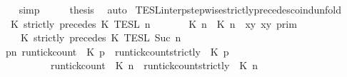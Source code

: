 \begin{isabellebody}
\ \ \ \ \isamarkupfalse%
\ simp\isanewline
\ \ \isamarkupfalse%
\ \isamarkupfalse%
\ {\isacharquery}thesis\ \isamarkupfalse%
\ auto\isanewline
{}\isamarkupfalse%
%
\endisatagproof
{\isafoldproof}%
%
\isadelimproof
\isanewline
%
\endisadelimproof
\isanewline
{}\isamarkupfalse%
\ TESL{\isacharunderscore}interp{\isacharunderscore}stepwise{\isacharunderscore}strictly{\isacharunderscore}precedes{\isacharunderscore}coind{\isacharunderscore}unfold{\isacharcolon}\isanewline
\ \ \ {\isacartoucheopen}{\isasymlbrakk}\ K\ strictly\ precedes\ K\ {\isasymrbrakk}\isactrlsub T\isactrlsub E\isactrlsub S\isactrlsub L\isactrlbsup {\isasymge}\ n\isactrlesup \ {\isacharequal}\isanewline
\ \ \ \ {\isasymlbrakk}\ {\isacharparenleft}{\isasymlceil}{\isacharhash}\isactrlsup {\isasymle}\ K\ n{\isacharcomma}\ {\isacharhash}\isactrlsup {\isacharless}\ K\ n{\isasymrceil}\ {\isasymin}\ {\isacharparenleft}{\isasymlambda}{\isacharparenleft}x{\isacharcomma}y{\isacharparenright}{\isachardot}\ x{\isasymle}y{\isacharparenright}{\isacharparenright}\ {\isasymrbrakk}\isactrlsub p\isactrlsub r\isactrlsub i\isactrlsub m\isanewline
\ \ \ \ {\isasyminter}\ {\isasymlbrakk}\ K\ strictly\ precedes\ K\ {\isasymrbrakk}\isactrlsub T\isactrlsub E\isactrlsub S\isactrlsub L\isactrlbsup {\isasymge}\ Suc\ n\isactrlesup {\isacartoucheclose}\isanewline
%
\isadelimproof
%
\endisadelimproof
%
\isatagproof
{}\isamarkupfalse%
\ {\isacharminus}\isanewline
\ \ \isamarkupfalse%
\ {\isacartoucheopen}{\isacharbraceleft}\ {\isasymrho}{\isachardot}\ {\isasymforall}p{\isasymge}n{\isachardot}\ {\isacharparenleft}run{\isacharunderscore}tick{\isacharunderscore}count\ {\isasymrho}\ K\ p{\isacharparenright}\ {\isasymle}\ {\isacharparenleft}run{\isacharunderscore}tick{\isacharunderscore}count{\isacharunderscore}strictly\ {\isasymrho}\ K\ p{\isacharparenright}\ {\isacharbraceright}\isanewline
\ \ \ \ \ \ \ \ \ {\isacharequal}\ {\isacharbraceleft}\ {\isasymrho}{\isachardot}\ {\isacharparenleft}run{\isacharunderscore}tick{\isacharunderscore}count\ {\isasymrho}\ K\ n{\isacharparenright}\ {\isasymle}\ {\isacharparenleft}run{\isacharunderscore}tick{\isacharunderscore}count{\isacharunderscore}strictly\ {\isasymrho}\ K\ n{\isacharparenright}\ {\isacharbraceright}\isanewline

\end{isabellebody}

